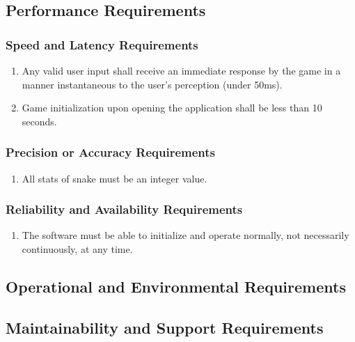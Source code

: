 \documentclass[12pt, titlepage]{article}
\begin{document}
\subsection{Performance Requirements}


\subsubsection{Speed and Latency Requirements}
\label{ssub:speed_and_latency_requirements}
\begin{enumerate}[{PR}1. ]
	\item Any valid user input shall receive an immediate response by the game in a manner instantaneous to the user’s perception (under 50ms).
	\item Game initialization upon opening the application shall be less than 10 seconds.
\end{enumerate}

\subsubsection{Precision or Accuracy Requirements}
\label{ssub:precision_or_accuracy_requirements}
\begin{enumerate}[{PR}1. ]
	\item All stats of snake must be an integer value.
\end{enumerate}

\subsubsection{Reliability and Availability Requirements}
\label{ssub:reliability_and_availability_requirements}
\begin{enumerate}[{PR}1. ]
	\item The software must be able to initialize and operate normally, not necessarily continuously, at any time.
\end{enumerate}



\subsection{Operational and Environmental Requirements}



\subsection{Maintainability and Support Requirements}
\label{sub:maintainability_and_support_requirements}
\end{document}
